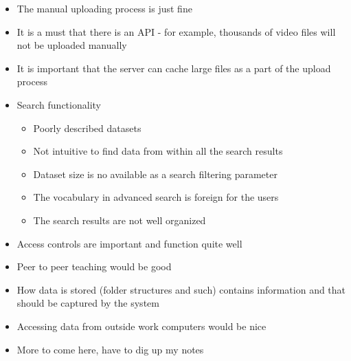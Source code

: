 \begin{itemize}
    \item The manual uploading process is just fine
    \item It is a must that there is an API - for example, thousands of video
          files will not be uploaded manually
    \item It is important that the server can cache large files as a part of
          the upload process
    \item Search functionality
        \begin{itemize}
            \item Poorly described datasets
            \item Not intuitive to find data from within all the search results
            \item Dataset size is no available as a search filtering parameter
            \item The vocabulary in advanced search is foreign for the users
            \item The search results are not well organized
        \end{itemize}
    \item Access controls are important and function quite well
    \item Peer to peer teaching would be good
    \item How data is stored (folder structures and such) contains information
          and that should be captured by the system
    \item Accessing data from outside work computers would be nice
    \item More to come here, have to dig up my notes
\end{itemize}

